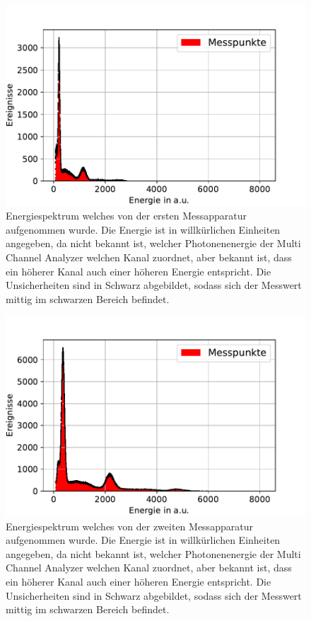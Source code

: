 \documentclass[
	a4paper,
	12pt,
	pagesize,
	ngerman
]{scrartcl}
\begin{document}
	\begin{figure}[H]
				\includegraphics[width= 0.9 \linewidth]{img/Energiespektrum_Start}
				\caption{
				Energiespektrum welches von der ersten Messapparatur aufgenommen wurde.
				Die Energie ist in willkürlichen Einheiten angegeben, da nicht bekannt ist, welcher Photonenenergie der Multi Channel Analyzer welchen Kanal zuordnet, aber bekannt ist, dass ein höherer Kanal auch einer höheren Energie entspricht.
				Die Unsicherheiten sind in Schwarz abgebildet, sodass sich der Messwert mittig im schwarzen Bereich befindet.
				}
				\label{fig_energy_start}
		\end{figure}

	\begin{figure}[H]
				\includegraphics[width= 0.9 \linewidth]{img/Energiespektrum_Stop}
				\caption{
				Energiespektrum welches von der zweiten Messapparatur aufgenommen wurde.
				Die Energie ist in willkürlichen Einheiten angegeben, da nicht bekannt ist, welcher Photonenenergie der Multi Channel Analyzer welchen Kanal zuordnet, aber bekannt ist, dass ein höherer Kanal auch einer höheren Energie entspricht.
				Die Unsicherheiten sind in Schwarz abgebildet, sodass sich der Messwert mittig im schwarzen Bereich befindet.
				}
				\label{fig_energy_stop}
		\end{figure}
\end{document}
